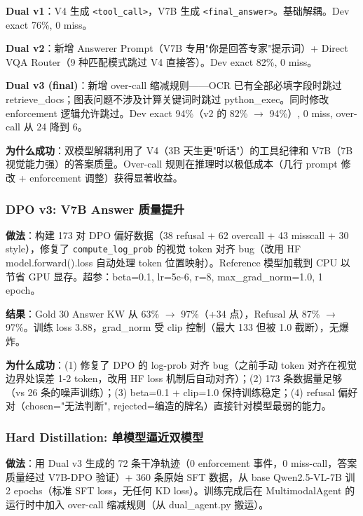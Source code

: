 \documentclass[12pt,a4paper]{ctexart}
\begin{document}
\textbf{Dual v1}：V4 生成 \texttt{<tool\_call>}，V7B 生成 \texttt{<final\_answer>}。基础解耦。Dev exact 76\%, 0 miss。

\textbf{Dual v2}：新增 Answerer Prompt（V7B 专用"你是回答专家"提示词）+ Direct VQA Router（9 种匹配模式跳过 V4 直接答）。Dev exact 82\%, 0 miss。

\textbf{Dual v3 (final)}：新增 over-call 缩减规则——OCR 已有全部必填字段时跳过 retrieve\_docs；图表问题不涉及计算关键词时跳过 python\_exec。同时修改 enforcement 逻辑允许跳过。Dev exact 94\%（v2 的 82\% $\rightarrow$ 94\%）, 0 miss, over-call 从 24 降到 6。

\textbf{为什么成功}：双模型解耦利用了 V4（3B 天生更"听话"）的工具纪律和 V7B（7B 视觉能力强）的答案质量。Over-call 规则在推理时以极低成本（几行 prompt 修改 + enforcement 调整）获得显著收益。

\subsubsection{DPO v3: V7B Answer 质量提升}

\textbf{做法}：构建 173 对 DPO 偏好数据（38 refusal + 62 overcall + 43 misscall + 30 style），修复了 \texttt{compute\_log\_prob} 的视觉 token 对齐 bug（改用 HF model.forward().loss 自动处理 token 位置映射）。Reference 模型加载到 CPU 以节省 GPU 显存。超参：beta=0.1, lr=5e-6, r=8, max\_grad\_norm=1.0, 1 epoch。

\textbf{结果}：Gold 30 Answer KW 从 63\% $\rightarrow$ 97\%（+34 点），Refusal 从 87\% $\rightarrow$ 97\%。训练 loss 3.88，grad\_norm 受 clip 控制（最大 133 但被 1.0 截断），无爆炸。

\textbf{为什么成功}：(1) 修复了 DPO 的 log-prob 对齐 bug（之前手动 token 对齐在视觉边界处误差 1-2 token，改用 HF loss 机制后自动对齐）；(2) 173 条数据量足够（vs 26 条的噪声训练）；(3) beta=0.1 + clip=1.0 保持训练稳定；(4) refusal 偏好对（chosen="无法判断", rejected=编造的牌名）直接针对模型最弱的能力。

\subsubsection{Hard Distillation: 单模型逼近双模型}

\textbf{做法}：用 Dual v3 生成的 72 条干净轨迹（0 enforcement 事件，0 miss-call，答案质量经过 V7B-DPO 验证）+ 360 条原始 SFT 数据，从 base Qwen2.5-VL-7B 训 2 epochs（标准 SFT loss，无任何 KD loss）。训练完成后在 MultimodalAgent 的运行时中加入 over-call 缩减规则（从 dual\_agent.py 搬运）。
\end{document}
